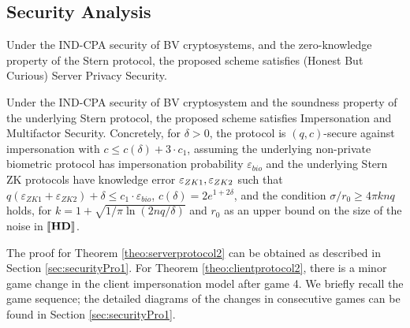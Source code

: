 \subsection{Security Analysis}
\label{sec:protocol2SecurityProof}
\begin{theorem}
  \label{theo:serverprotocol2}
  Under the IND-CPA security of BV cryptosystems, and the zero-knowledge property of the Stern protocol, the proposed
  scheme satisfies (Honest But Curious) Server Privacy Security.
\end{theorem}
\begin{theorem}
  \label{theo:clientprotocol2}
  Under the IND-CPA security of BV cryptosystem and the soundness property of
  the underlying Stern protocol, the proposed scheme satisfies Impersonation and
  Multifactor Security. Concretely, for $\delta>0$, the protocol is
  $(q,c)$-secure against impersonation with $c \leq c(\delta) + 3 \cdot c_1$,
  assuming the underlying non-private biometric protocol has impersonation
  probability $\varepsilon_{bio}$ and the underlying Stern ZK protocols have
  knowledge error $\varepsilon_{ZK1},\varepsilon_{ZK2}$ such that
  $q(\varepsilon_{ZK1}+\varepsilon_{ZK2}) + \delta \leq c_1 \cdot
  \varepsilon_{bio}$, $c(\delta) = 2 e^{1+2\delta}$, and the condition
  $\sigma/r_0 \geq 4 \pi k n q$ holds, for
  $k = 1 + \sqrt{1/\pi \ln(2nq/\delta)}$ and $r_0$ as an upper bound on the size
  of the noise in $\left\llbracket\mathbf{HD}\right\rrbracket$.
\end{theorem}

The proof for Theorem \ref{theo:serverprotocol2} can be obtained as described in
Section \ref{sec:securityPro1}. For Theorem \ref{theo:clientprotocol2}, there is
a minor game change in the client impersonation model after game 4. We briefly
recall the game sequence; the detailed
diagrams of the changes in consecutive games can be found in Section
\ref{sec:securityPro1}.

